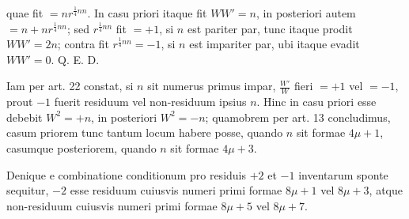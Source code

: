 quae fit $=nr^{\frac14nn}$. In casu priori itaque fit $WW'=n$, in posteriori autem $=n+nr^{\frac14nn}$; sed $r^{\frac14nn}$ fit $=+1$, si $n$ est pariter par, tunc itaque prodit $WW'=2n$; contra fit $r^{\frac14nn}=-1$, si $n$ est impariter par, ubi itaque evadit $WW'=0$. Q. E. D.


Iam per art. 22 constat, si $n$ sit numerus primus impar, $\frac{W'}{W}$ fieri $=+1$ vel $=-1$, prout $-1$ fuerit residuum vel non-residuum ipsius $n$. Hinc in casu priori esse debebit $W^2=+n$, in posteriori $W^2=-n$; quamobrem per art. 13 concludimus, casum priorem tunc tantum locum habere posse, quando $n$ sit formae $4\mu+1$, casumque posteriorem, quando $n$ sit formae $4\mu+3$.

Denique e combinatione conditionum pro residuis $+2$ et $-1$ inventarum sponte sequitur, $-2$ esse residuum cuiusvis numeri primi formae $8\mu+1$ vel $8\mu+3$, atque non-residuum cuiusvis numeri primi formae $8\mu+5$ vel $8\mu+7$.

\BookRule{42mm}
